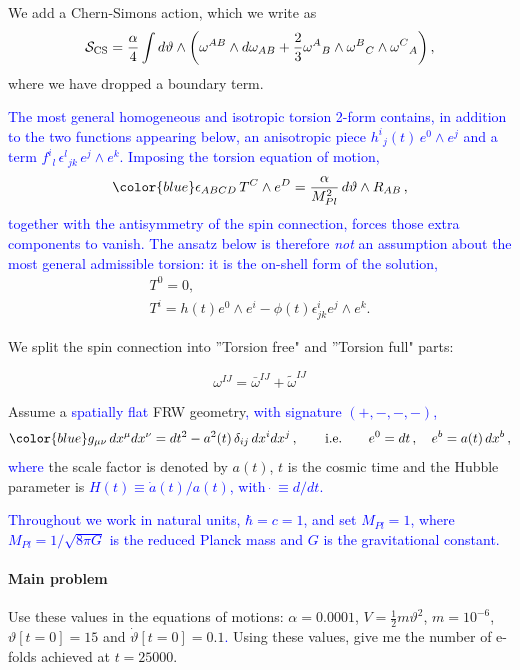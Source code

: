 We add a Chern-Simons action, which we write as
\begin{align}
\mathcal{S}_{\rm CS}=\frac{\alpha}{4}\int d\vartheta\wedge \left( \omega^{AB} \wedge d\omega_{AB} +\frac{2}{3}\omega^A{}_B\wedge\omega^B{}_C\wedge\omega^C{}_A\right),
\end{align}
where we have dropped a boundary term. 

\textcolor{blue}{The most general homogeneous and isotropic torsion 2-form contains, in addition to the two functions appearing below, an anisotropic piece $h^i{}_j(t)\,e^0\wedge e^j$ and a term $f^i{}_l\,\epsilon^l{}_{jk}\,e^j\wedge e^k$. Imposing the torsion equation of motion,}
\begin{align}
{\color{blue}
\epsilon_{ABCD}\,T^C\wedge e^D = \frac{\alpha}{M_{Pl}^{2}}\, d\vartheta\wedge R_{AB}\,,}
\end{align}
\textcolor{blue}{together with the antisymmetry of the spin connection, forces those extra components to vanish. The ansatz below is therefore \emph{not} an assumption about the most general admissible torsion: it is the on-shell form of the solution,}
\begin{align}
T^0 =  0,
\\
T^i = h(t)e^0\wedge e^i - \phi(t)\epsilon^i_{jk} e^j \wedge e^k.
\end{align}

We split the spin connection into ''Torsion free" and ''Torsion full" parts:

\begin{equation}
\omega^{IJ} = \bar{\omega}^{IJ} + \tilde{\omega}^{IJ}
\end{equation}

Assume a \textcolor{blue}{spatially flat} FRW geometry\textcolor{blue}{, with signature $(+,-,-,-)$,}
\begin{align}
{\color{blue}
g_{\mu\nu}\,dx^{\mu}dx^{\nu} = dt^{2} - a^{2}(t)\,\delta_{ij}\,dx^{i}dx^{j}\,,
\qquad\text{i.e.}\qquad
e^{0} = dt\,,\quad e^{b} = a(t)\,dx^{b}\,,}
\end{align}
\textcolor{blue}{where} the scale factor is denoted by $a(t)$, $t$ is the cosmic time and the Hubble parameter is \textcolor{blue}{$H(t)\equiv\dot a(t)/a(t)$, with $\dot{\;}\equiv d/dt$.}

\textcolor{blue}{Throughout we work in natural units, $\hbar = c = 1$, and set $M_{Pl} = 1$, where $M_{Pl} = 1/\sqrt{8\pi G}$ is the reduced Planck mass and $G$ is the gravitational constant.}

\paragraph*{Main problem}


Use these values in the equations of motions: $\alpha = 0.0001$, $V = \frac{1}{2}m\vartheta^2$, $m = 10^{-6}$, $\vartheta[t = 0] = 15$ and $\dot{\vartheta}[t = 0] = 0.1$\textcolor{blue}{.} Using these values, give me the number of e-folds achieved at $t = 25000$.
